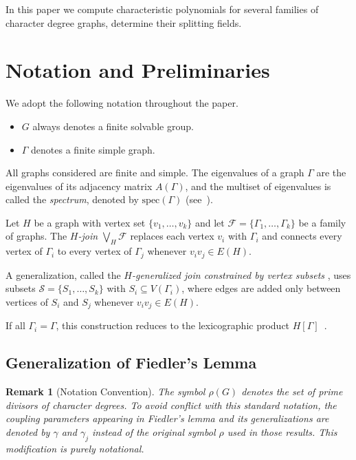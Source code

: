 \documentclass[11pt]{amsart}
\newtheorem{rem}[thm]{\bf Remark}
\begin{document}
In this paper we compute characteristic polynomials for several families of character degree graphs, determine their splitting fields.


\section{Notation and Preliminaries}


We adopt the following notation throughout the paper.

\begin{itemize}
\item $G$ always denotes a finite solvable group.
\item $\Gamma$ denotes a finite simple graph.
\end{itemize}

All graphs considered are finite and simple. The eigenvalues of a graph $\Gamma$ are the eigenvalues of its adjacency matrix $A(\Gamma)$, and the multiset of eigenvalues is called the \emph{spectrum}, denoted by $\mathrm{spec}(\Gamma)$ (see~\cite{Cvetkovic1995,Cvetkovic2010}).

Let $H$ be a graph with vertex set $\{v_1,\ldots,v_k\}$ and let $\mathcal{F}=\{\Gamma_1,\ldots,\Gamma_k\}$ be a family of graphs. The \emph{$H$-join} $\bigvee_H\mathcal{F}$ replaces each vertex $v_i$ with $\Gamma_i$ and connects every vertex of $\Gamma_i$ to every vertex of $\Gamma_j$ whenever $v_iv_j\in E(H)$.

A generalization, called the \emph{$H$-generalized join constrained by vertex subsets} \cite{Cardoso2013a,Cardoso2013b}, uses subsets $\mathcal{S}=\{S_1,\ldots,S_k\}$ with $S_i\subseteq V(\Gamma_i)$, where edges are added only between vertices of $S_i$ and $S_j$ whenever $v_iv_j\in E(H)$.

If all $\Gamma_i=\Gamma$, this construction reduces to the lexicographic product $H[\Gamma]$~\cite{Godsil2001}.


\subsection*{Generalization of Fiedler’s Lemma}


\begin{rem}[Notation Convention]
The symbol $\rho(G)$ denotes the set of prime divisors of character degrees. To avoid conflict with this standard notation, the coupling parameters appearing in Fiedler's lemma and its generalizations \cite{Fiedler1974,Cardoso2011} are denoted by $\gamma$ and $\gamma_j$ instead of the original symbol $\rho$ used in those results. This modification is purely notational.
\end{rem}
\end{document}
